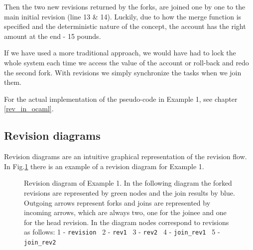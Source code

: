 \documentclass[12pt,twoside,notitlepage]{report}
\begin{document}
Then the two new revisions returned by the forks, are joined one by one to the main initial revision (line 13 \& 14). Luckily, due to how the merge function is specified and the deterministic nature of the concept, the account has the right amount at the end - 15 pounds.

If we have used a more traditional approach, we would have had to lock the whole system each time we access the value of the account or roll-back and redo the second fork. With revisions we simply synchronize the tasks when we join them.

For the actual implementation of the pseudo-code in Example 1, see chapter \ref{rev_in_ocaml}. 

\subsection{Revision diagrams}
\label{rev_diag}

Revision diagrams are an intuitive graphical representation of the revision flow. In Fig.\ref{fig1} there is an example of a revision diagram for Example 1. 


\begin{figure}[ht!]
\centering


\caption{Revision diagram of Example 1. In the following diagram the forked revisions are represented by green nodes and the join results by blue. Outgoing arrows represent forks and  joins are represented by incoming arrows, which are always two, one for the joinee and one for the head revision. In the diagram nodes correspond to revisions as follows: 1 - {\tt revision } 2 - {\tt rev1 } 3 - {\tt rev2 } 4 - {\tt join\_rev1 } 5 - {\tt join\_rev2} }
\label{fig1}
\end{figure}
 
\end{document}
